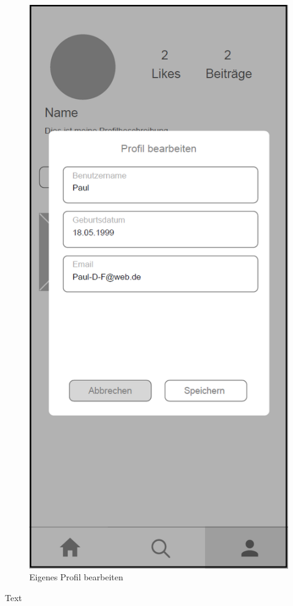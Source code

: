 \begin{figure}[H]
\begin{minipage}{.5\textwidth}
      \includegraphics[width=.8\linewidth]{images/Edit_Profil_MockUp.png}
      \caption{Eigenes Profil bearbeiten}
      \label{fig:edit_profil}
    \end{minipage}
\end{figure}

Text

